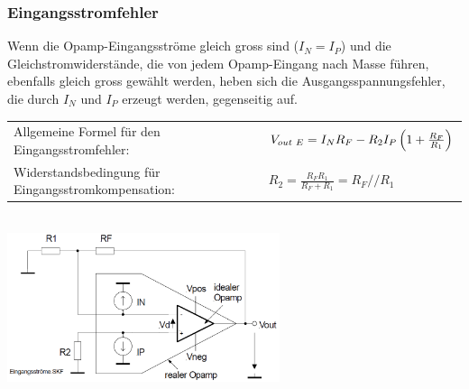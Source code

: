 		\subsubsection{Eingangsstromfehler }
			\begin{minipage}{18cm}
              Wenn die Opamp-Eingangsströme gleich gross sind
              ($I_{N}=I_{P}$) und die Gleichstromwiderstände,
              die von jedem Opamp-Eingang nach Masse führen, 
              ebenfalls gleich gross gewählt werden, heben sich die
              Ausgangsspannungsfehler, die durch $I_{N}$ und $I_{P}$
              erzeugt werden, gegenseitig auf. \\
              \begin{tabular}{ll}
              Allgemeine Formel für den
              Eingangsstromfehler: &
              $V_{out \hspace{1mm}E}=I_N R_F-R_2 I_P\left( 1+\frac{R_F}{R_1} \right)$\\
              Widerstandsbedingung für Eingangsstromkompensation:&
              $R_2=\frac{R_F R_1}{R_F+R_1}=R_F // R_1$\\
            	\end{tabular}
            \end{minipage}\\
			\includegraphics[width=8cm]{./bilder/eingangsstromfehler.png}

